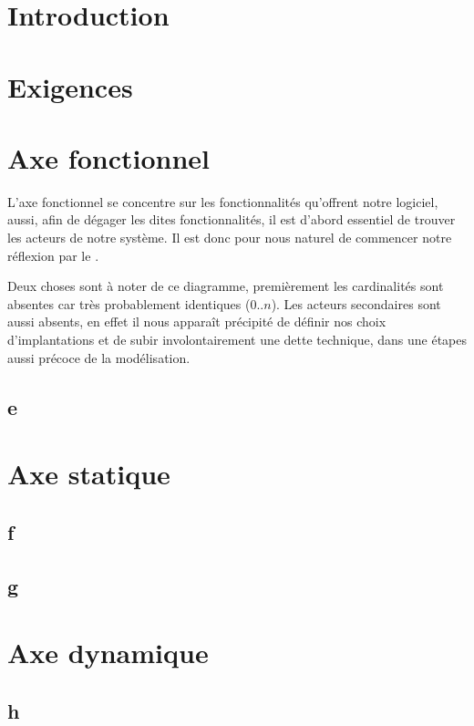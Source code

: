 \documentclass[a4paper,french,final]{memoir}
\begin{document}
\begin{titlingpage}
\hypersetup{pageanchor=false}

\end{titlingpage}
\frontmatter
\tableofcontents
\chapter{Introduction}
\mainmatter
\chapter{Exigences}\label{chapExigence}
\chapter{Axe fonctionnel}
\begin{center}

\end{center}
L'axe fonctionnel se concentre sur les fonctionnalités qu'offrent notre logiciel, aussi, afin de dégager les dites fonctionnalités, il est d'abord essentiel de trouver les acteurs de notre système. Il est donc pour nous naturel de commencer notre réflexion par le .

Deux choses sont à noter de ce diagramme, premièrement les cardinalités sont absentes car très probablement identiques ($0..n$).
Les acteurs secondaires sont aussi absents, en effet il nous apparaît précipité de définir nos choix d'implantations et de subir involontairement une dette technique, dans une étapes aussi précoce de la modélisation.
\section{e}
\chapter{Axe statique}\label{chapStatique}
\section{f}
\section{g}
\chapter{Axe dynamique}\label{chapDynamique}
\section{h}
\end{document}
